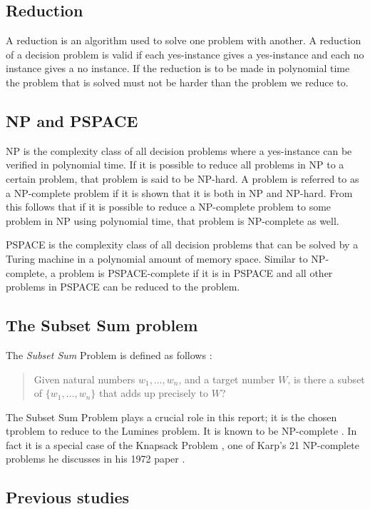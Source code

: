 \subsection{Reduction}
A reduction is an algorithm used to solve one problem with another. A reduction of a decision problem is valid if each yes-instance gives a yes-instance and each no instance gives a no instance. If the reduction is to be made in polynomial time the problem that is solved must not be harder than the problem we reduce to.\cite{reduction}

\subsection{NP and PSPACE}
NP is the complexity class of all decision problems where a yes-instance can be verified in polynomial time. If it is possible to reduce all problems in NP to a certain problem, that problem is said to be NP-hard. A problem is referred to as a NP-complete problem if it is shown that it is both in NP and NP-hard. From this follows that if it is possible to reduce a NP-complete problem to some problem in NP using polynomial time, that problem is NP-complete as well.

PSPACE is the complexity class of all decision problems that can be solved by a Turing machine in a polynomial amount of memory space. Similar to NP-complete, a problem is PSPACE-complete if it is in PSPACE and all other problems in PSPACE can be reduced to the problem.

\subsection{The Subset Sum problem}

The \textit{Subset Sum} Problem is defined as follows \cite[p.~491]{algorithm}:

\begin{quote}
Given natural numbers $w_1, \ldots, w_n$, and a target number $W$, is there a subset of $\{w_1, \ldots, w_n \}$ that adds up precisely to $W$?
\end{quote}

The Subset Sum Problem plays a crucial role in this report; it is the chosen tproblem to reduce to the Lumines problem. It is known to be NP-complete \cite[p.~492]{algorithm}. In fact it is a special case of the Knapsack Problem \cite[p.~491]{algorithm}, one of Karp's 21 NP-complete problems he discusses in his 1972 paper \cite{karp}.

\subsection{Previous studies}
